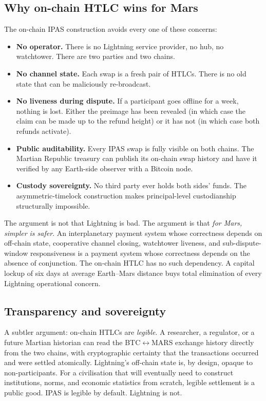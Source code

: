 \documentclass[11pt]{article}
\begin{document}
\subsection{Why on-chain HTLC wins for Mars}

The on-chain IPAS construction avoids every one of these concerns:
\begin{itemize}
  \item \textbf{No operator.} There is no Lightning service provider, no hub, no watchtower. There are two parties and two chains.
  \item \textbf{No channel state.} Each swap is a fresh pair of HTLCs. There is no old state that can be maliciously re-broadcast.
  \item \textbf{No liveness during dispute.} If a participant goes offline for a week, nothing is lost. Either the preimage has been revealed (in which case the claim can be made up to the refund height) or it has not (in which case both refunds activate).
  \item \textbf{Public auditability.} Every IPAS swap is fully visible on both chains. The Martian Republic treasury can publish its on-chain swap history and have it verified by any Earth-side observer with a Bitcoin node.
  \item \textbf{Custody sovereignty.} No third party ever holds both sides' funds. The asymmetric-timelock construction makes principal-level custodianship structurally impossible.
\end{itemize}

The argument is not that Lightning is bad. The argument is that \emph{for Mars, simpler is safer}. An interplanetary payment system whose correctness depends on off-chain state, cooperative channel closing, watchtower liveness, and sub-dispute-window responsiveness is a payment system whose correctness depends on the absence of conjunction. The on-chain HTLC has no such dependency. A capital lockup of six days at average Earth--Mars distance buys total elimination of every Lightning operational concern.

\subsection{Transparency and sovereignty}

A subtler argument: on-chain HTLCs are \emph{legible}. A researcher, a regulator, or a future Martian historian can read the BTC$\leftrightarrow$MARS exchange history directly from the two chains, with cryptographic certainty that the transactions occurred and were settled atomically. Lightning's off-chain state is, by design, opaque to non-participants. For a civilisation that will eventually need to construct institutions, norms, and economic statistics from scratch, legible settlement is a public good. IPAS is legible by default. Lightning is not.
\end{document}
